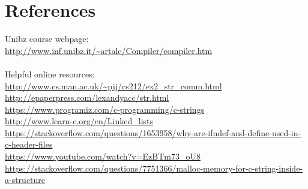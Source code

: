 \documentclass[12pt]{article}
\begin{document}
\section{References}
Unibz course webpage:\\
\url{http://www.inf.unibz.it/~artale/Compiler/compiler.htm}\\\\
Helpful online resources:\\
\url{http://www.cs.man.ac.uk/~pjj/cs212/ex2_str_comm.html}\\
\url{http://epaperpress.com/lexandyacc/str.html}\\
\url{https://www.programiz.com/c-programming/c-strings}\\
\url{http://www.learn-c.org/en/Linked_lists}\\
\url{https://stackoverflow.com/questions/1653958/why-are-ifndef-and-define-used-in-c-header-files}\\
\url{https://www.youtube.com/watch?v=EzBTm73_oU8}\\
\url{https://stackoverflow.com/questions/7751366/malloc-memory-for-c-string-inside-a-structure}




\end{document}
